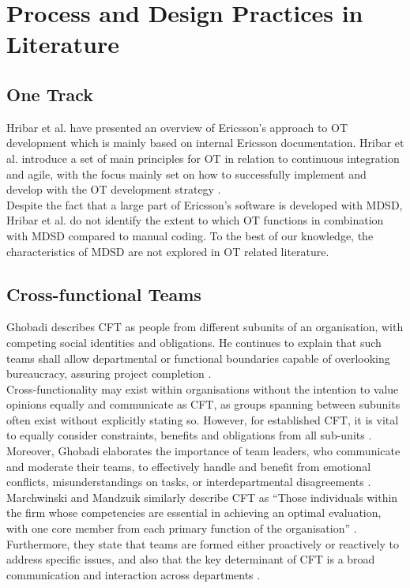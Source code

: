 \documentclass[fina_report_innit.tex]{subfiles}
\begin{document}
\section{Process and Design Practices in Literature}

\subsection{One Track}
Hribar et al. \cite{hribar2008first} have presented an overview of Ericsson's approach to OT development which is mainly based on internal Ericsson documentation. Hribar et al. introduce a set of main principles for OT in relation to continuous integration and agile, with the focus mainly set on how to successfully implement and develop with the OT development strategy \cite{hribar2008first}.
\\

Despite the fact that a large part of Ericsson's software is developed with MDSD, Hribar et al. do not identify the extent to which OT functions in combination with MDSD compared to manual coding. To the best of our knowledge, the characteristics of MDSD are not explored in OT related literature.

\subsection{Cross-functional Teams}
Ghobadi describes CFT as people from different subunits of an organisation, with competing social identities and obligations. He continues to explain that such teams shall allow departmental or functional boundaries capable of overlooking bureaucracy, assuring project completion \cite{ghobadi2011challenges}.
\\

Cross-functionality may exist within organisations without the intention to value opinions equally and communicate as CFT, as groups spanning between subunits often exist without explicitly stating so. However, for established CFT, it is vital to equally consider constraints, benefits and obligations from all sub-units \cite{ghobadi2011challenges}. Moreover, Ghobadi elaborates the importance of team leaders, who communicate and moderate their teams, to effectively handle and benefit from emotional conflicts, misunderstandings on tasks, or interdepartmental disagreements \cite{ghobadi2011challenges}.
\\

Marchwinski and Mandzuik similarly describe CFT as ``Those individuals within the firm whose competencies are essential in achieving an optimal evaluation, with one core member from each primary function of the organisation'' \cite{marchwinski2000technical}. Furthermore, they state that teams are formed either proactively or reactively to address specific issues, and also that the key determinant of CFT is a broad communication and interaction across departments \cite{marchwinski2000technical}.
\end{document}
